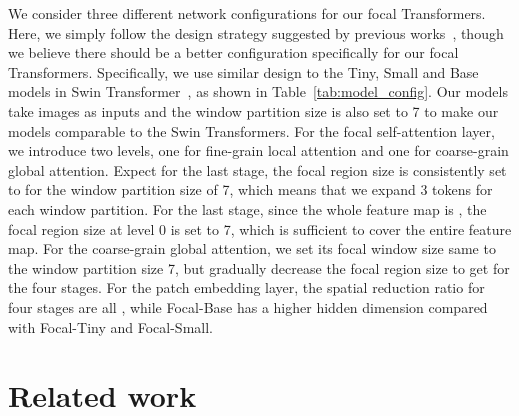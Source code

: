 \documentclass{article}
\begin{document}
We consider three different network configurations for our focal Transformers. Here, we simply follow the design strategy suggested by previous works~\cite{wang2021pyramid,wu2021cvt,liu2021swin}, though we believe there should be a better configuration specifically for our focal Transformers. Specifically, we use similar design to the Tiny, Small and Base models in Swin Transformer~\cite{liu2021swin}, as shown in Table~\ref{tab:model_config}. Our models take  images as inputs and the window partition size is also set to 7 to make our models comparable to the Swin Transformers. For the focal self-attention layer, we introduce two levels, one for fine-grain local attention and one for coarse-grain global attention. Expect for the last stage, the focal region size is consistently set to  for the window partition size of 7, which means that we expand 3 tokens for each window partition. For the last stage, since the whole feature map is , the focal region size at level 0 is set to 7, which is sufficient to cover the entire feature map. For the coarse-grain global attention, we set its focal window size same to the window partition size 7, but gradually decrease the focal region size to get  for the four stages. For the patch embedding layer, the spatial reduction ratio  for four stages are all , while Focal-Base has a higher hidden dimension compared with Focal-Tiny and Focal-Small. \section{Related work}
\end{document}
